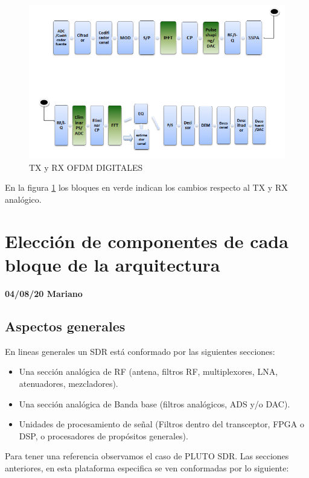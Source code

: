 \documentclass[a4paper,12pt]{report} %
\begin{document}
\begin{figure}[H]
	\centering
	\includegraphics[scale=0.9]{Imagenes/Arquitectura/alt_dig}
	\caption{TX y RX OFDM DIGITALES}
	\label{alt_dig}
\end{figure}

En la figura \ref{alt_dig} los bloques en verde indican los cambios respecto al TX y RX analógico.


\chapter{Elección de componentes de cada bloque de la arquitectura}

\textbf{04/08/20 Mariano}

\section{Aspectos generales} \cite{sdr_engineers}

En lineas generales un SDR está conformado por las siguientes secciones:

\begin{itemize}
	\item Una sección analógica de RF (antena, filtros RF, multiplexores, LNA, atenuadores, mezcladores).
	\item Una sección analógica de Banda base (filtros analógicos, ADS y/o DAC).
	\item Unidades de procesamiento de señal (Filtros dentro del transceptor, FPGA o DSP, o procesadores de propósitos generales).
\end{itemize}

Para tener una referencia observamos el caso de PLUTO SDR. Las secciones anteriores, en esta plataforma especifica se ven conformadas por lo siguiente:
\end{document}
